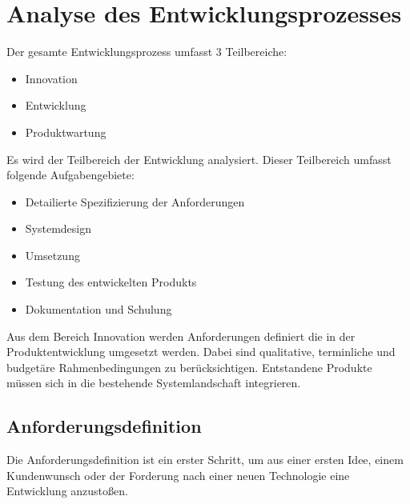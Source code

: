 \chapter{Analyse des Entwicklungsprozesses}\label{chap:related}
\chapterstart

Der gesamte Entwicklungsprozess umfasst 3 Teilbereiche:

\begin{itemize}

    \item Innovation
    \item Entwicklung
    \item Produktwartung

\end{itemize}

Es wird der Teilbereich der Entwicklung analysiert. Dieser Teilbereich umfasst folgende Aufgabengebiete:

\begin{itemize}

    \item Detailierte Spezifizierung der Anforderungen
    \item Systemdesign
    \item Umsetzung
    \item Testung des entwickelten Produkts
    \item Dokumentation und Schulung

\end{itemize}

Aus dem Bereich Innovation werden Anforderungen definiert die in der Produktentwicklung umgesetzt werden. Dabei sind qualitative, terminliche und budgetäre Rahmenbedingungen zu berücksichtigen. Entstandene Produkte müssen sich in die bestehende Systemlandschaft integrieren.

\section{Anforderungsdefinition}

Die Anforderungsdefinition ist ein erster Schritt, um aus einer ersten Idee, einem Kundenwunsch oder der Forderung nach einer neuen Technologie eine Entwicklung anzustoßen. 


